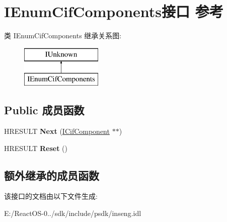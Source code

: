 \hypertarget{interface_i_enum_cif_components}{}\section{I\+Enum\+Cif\+Components接口 参考}
\label{interface_i_enum_cif_components}
类 I\+Enum\+Cif\+Components 继承关系图\+:\begin{figure}[H]
\begin{center}
\leavevmode
\includegraphics[height=2.000000cm]{interface_i_enum_cif_components}
\end{center}
\end{figure}
\subsection*{Public 成员函数}
\begin{DoxyCompactItemize}
\item 
\mbox{\label{interface_i_enum_cif_components_a23095f33401eb68216cad926c6c45d8e}} 
H\+R\+E\+S\+U\+LT {\bfseries Next} (\hyperlink{interface_i_cif_component}{I\+Cif\+Component} $\ast$$\ast$)
\item 
\mbox{\label{interface_i_enum_cif_components_a37dab120ffe5b1d2495feff17474ca73}} 
H\+R\+E\+S\+U\+LT {\bfseries Reset} ()
\end{DoxyCompactItemize}
\subsection*{额外继承的成员函数}


该接口的文档由以下文件生成\+:\begin{DoxyCompactItemize}
\item 
E\+:/\+React\+O\+S-\/0../sdk/include/psdk/inseng.\+idl\end{DoxyCompactItemize}

